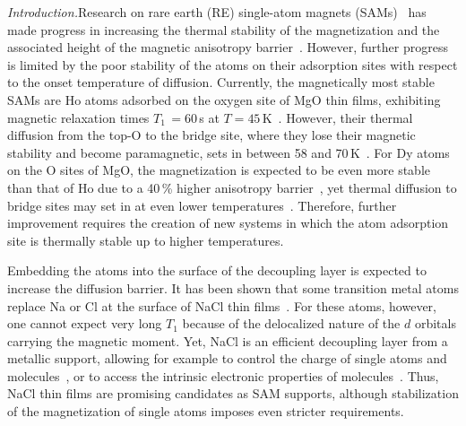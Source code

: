 {\begin{abstract}
We report magnetic bistability in single Dy atoms on NaCl(100) thin films. Individual Dy atoms substituting Na at the surface of the NaCl layer are thermally stable up to at least 300\,K, display $4f^{9}$ occupancy, out-of-plane easy magnetization axis, and long spin relaxation time $T_1$ of about 10\,s at 2.5\,K; thereby they are the first single atom magnet on a thermally stable adsorption site. Dy atoms adsorbed onto the Cl and bridge sites display $4f^{10}$ occupancy. Dy on top-Cl exhibit magnetic hysteresis and a $T_1$ of 550\,s at 0.3\,T and 2.5\,K. The observed slow magnetic relaxation of Dy on both adsorption sites introduces NaCl as an effective  platform for single atom magnets.
\end{abstract}


\maketitle
\textit{Introduction.}\textemdash  Research on rare earth (RE) single-atom magnets (SAMs)~\cite{don16, bal16, nat17, mar17, all17, nat18, for19, don20, sin21, don21, bel22, sor23} has made progress in increasing the thermal stability of the magnetization and the associated height of the magnetic anisotropy barrier~\cite{nat18, sin21}. However, further progress is limited by the poor stability of the atoms on their adsorption sites with respect to the onset temperature of diffusion. Currently, the magnetically most stable SAMs are Ho atoms adsorbed on the oxygen site of MgO thin films, exhibiting magnetic relaxation times $T_1\,= 60$\,s at $T = 45$\,K~\cite{nat18}. However, their thermal diffusion from the top-O to the bridge site, where they lose their magnetic stability and become paramagnetic, sets in between 58 and 70\,K~\cite{fer17thesis}. For Dy atoms on the O sites of MgO, the magnetization is expected to be even more stable than that of Ho due to a 40\,\% higher anisotropy barrier~\cite{sin21,don21APL}, yet thermal diffusion to bridge sites may set in at even lower temperatures~\cite{fer17thesis, sin21}. Therefore, further improvement requires the creation of new systems in which the atom adsorption site is thermally stable up to higher temperatures.

Embedding the atoms into the surface of the decoupling layer is expected to increase the diffusion barrier. It has been shown that some transition metal atoms replace Na or Cl at the surface of NaCl thin films~\cite{li14, li15, bib:li22}. For these atoms, however, one cannot expect very long $T_1$  because of the delocalized nature of the $d$ orbitals carrying the magnetic moment. Yet, NaCl is an efficient decoupling layer from a metallic support, allowing for example to control the charge of single atoms and molecules~\cite{rep04, ols07, leo11, li16}, or to access the intrinsic electronic  properties of molecules~\cite{rep05b, ros09, ima18, kai19, pat19}. Thus, NaCl thin films are promising candidates as SAM supports, although stabilization of the magnetization of single atoms imposes even stricter requirements.

}
